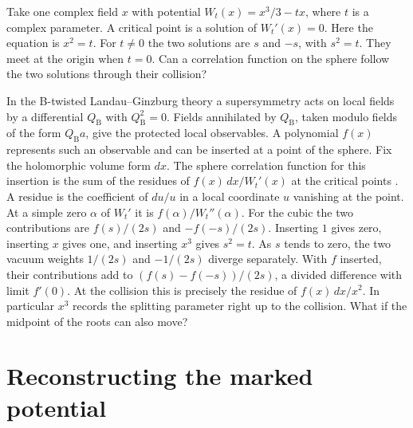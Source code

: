 \documentclass{momentum}
\begin{document}
\maketitle

\noindent
Take one complex field \(x\) with potential \(W_t(x)=x^3/3-tx\), where
\(t\) is a complex parameter. A critical point is a solution of
\(W_t'(x)=0\). Here the equation is \(x^2=t\). For \(t\ne0\) the two
solutions are \(s\) and \(-s\), with \(s^2=t\). They meet at the origin
when \(t=0\). Can a correlation function on the sphere follow the two
solutions through their collision?

In the B-twisted Landau--Ginzburg theory a supersymmetry acts on local
fields by a differential \(Q_{\mathrm B}\) with \(Q_{\mathrm B}^2=0\).
Fields annihilated by \(Q_{\mathrm B}\), taken modulo fields of the form \(Q_{\mathrm B}a\),
give the protected local observables. A polynomial \(f(x)\) represents
such an observable and can be inserted at a point of the sphere.
Fix the holomorphic volume form \(dx\). The sphere correlation function
for this insertion is the sum of the residues of \(f(x)\,dx/W_t'(x)\)
at the critical points \cite{vafa}.
A residue is the coefficient of \(du/u\) in a local coordinate \(u\)
vanishing at the point. At a simple zero \(\alpha\) of \(W_t'\) it is
\(f(\alpha)/W_t''(\alpha)\). For the cubic the two contributions are
\(f(s)/(2s)\) and \(-f(-s)/(2s)\). Inserting \(1\) gives zero, inserting
\(x\) gives one, and inserting \(x^3\) gives \(s^2=t\).
As \(s\) tends to zero, the two vacuum weights \(1/(2s)\) and \(-1/(2s)\)
diverge separately. With \(f\) inserted, their contributions add to
\((f(s)-f(-s))/(2s)\), a divided difference with limit \(f'(0)\).
At the collision this is precisely the residue of \(f(x)\,dx/x^2\).
In particular \(x^3\) records the splitting parameter right up to the
collision. What if the midpoint of the roots can also move?

\section{Reconstructing the marked potential}
\end{document}
